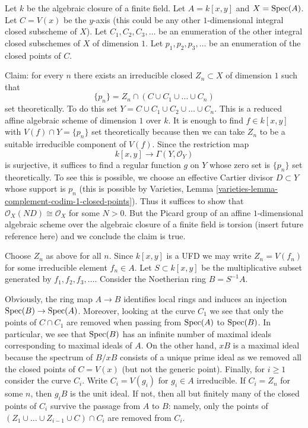 \noindent
Let $k$ be the algebraic closure of a finite field.
Let $A = k[x, y]$ and $X = \mathop{\mathrm{Spec}}(A)$.
Let $C = V(x)$ be the $y$-axis (this could be any other
$1$-dimensional integral closed subscheme of $X$).
Let $C_1, C_2, C_3, \ldots$ be an enumeration
of the other integral closed subschemes of $X$ of dimension $1$.
Let $p_1, p_2, p_3, \ldots$ be an
enumeration of the closed points of $C$.

\medskip\noindent
Claim: for every $n$ there exists an irreducible closed
$Z_n \subset X$ of dimension $1$ such that
$$
\{p_n\} = Z_n \cap (C \cup C_1 \cup \ldots \cup C_n)
$$
set theoretically. To do this set
$Y = C \cup C_1 \cup C_2 \cup \ldots \cup C_n$.
This is a reduced affine algebraic scheme of dimension $1$ over $k$.
It is enough to find $f \in k[x, y]$ with $V(f) \cap  Y = \{p_n\}$
set theoretically because then we can take $Z_n$ to be a suitable
irreducible component of $V(f)$. Since the restriction map
$$
k[x, y] \longrightarrow \Gamma(Y, \mathcal{O}_Y)
$$
is surjective, it suffices to find a regular function $g$ on $Y$
whose zero set is $\{p_n\}$ set theoretically.
To see this is possible, we choose an effective Cartier divisor
$D \subset Y$ whose support is $p_n$ (this is possible by
Varieties, Lemma \ref{varieties-lemma-complement-codim-1-closed-points}).
Thus it suffices to show that $\mathcal{O}_X(ND) \cong \mathcal{O}_X$
for some $N > 0$. But the Picard group of an affine $1$-dimensional
algebraic scheme over the algebraic closure of a finite field is torsion
(insert future reference here) and we conclude the claim is true.

\medskip\noindent
Choose $Z_n$ as above for all $n$. Since $k[x, y]$ is a UFD
we may write $Z_n = V(f_n)$ for some irreducible element $f_n \in A$.
Let $S \subset k[x, y]$ be the multiplicative subset generated
by $f_1, f_2, f_3, \ldots$. Consider the Noetherian ring $B = S^{-1}A$.

\medskip\noindent
Obviously, the ring map $A \to B$ identifies local rings
and induces an injection $\mathop{\mathrm{Spec}}(B) \to \mathop{\mathrm{Spec}}(A)$.
Moreover, looking at the curve $C_1$ we see that
only the points of $C \cap C_1$ are removed when passing
from $\mathop{\mathrm{Spec}}(A)$ to $\mathop{\mathrm{Spec}}(B)$.
In particular, we see that $\mathop{\mathrm{Spec}}(B)$ has an infinite
number of maximal ideals corresponding to maximal
ideals of $A$. On the other hand, $xB$ is a maximal ideal because
the spectrum of $B/xB$ consists of a unique prime ideal
as we removed all the closed points of $C = V(x)$ (but not
the generic point).
Finally, for $i \geq 1$ consider the curve $C_i$.
Write $C_i = V(g_i)$ for $g_i \in A$ irreducible.
If $C_i = Z_n$ for some $n$, then $g_iB$ is the unit ideal.
If not, then all but finitely many of the closed points
of $C_i$ survive the passage from $A$ to $B$:
namely, only the points of
$(Z_1 \cup \ldots \cup Z_{i - 1} \cup C) \cap C_i$
are removed from $C_i$.

